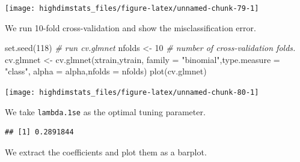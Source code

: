 \documentclass[
]{book}
\newenvironment{Shaded}{\begin{snugshade}}{\end{snugshade}}
\newcommand{\AttributeTok}[1]{\textcolor[rgb]{0.77,0.63,0.00}{#1}}
\newcommand{\CommentTok}[1]{\textcolor[rgb]{0.56,0.35,0.01}{\textit{#1}}}
\newcommand{\DecValTok}[1]{\textcolor[rgb]{0.00,0.00,0.81}{#1}}
\newcommand{\FloatTok}[1]{\textcolor[rgb]{0.00,0.00,0.81}{#1}}
\newcommand{\FunctionTok}[1]{\textcolor[rgb]{0.00,0.00,0.00}{#1}}
\newcommand{\NormalTok}[1]{#1}
\newcommand{\OtherTok}[1]{\textcolor[rgb]{0.56,0.35,0.01}{#1}}
\newcommand{\SpecialCharTok}[1]{\textcolor[rgb]{0.00,0.00,0.00}{#1}}
\newcommand{\StringTok}[1]{\textcolor[rgb]{0.31,0.60,0.02}{#1}}
\begin{document}
\begin{center}\texttt{[image: highdimstats\_files/figure-latex/unnamed-chunk-79-1]} \end{center}

We run 10-fold cross-validation and show the misclassification error.

\begin{Shaded}
\begin{Highlighting}[]
\FunctionTok{set.seed}\NormalTok{(}\DecValTok{118}\NormalTok{)}
\CommentTok{\# run cv.glmnet}
\NormalTok{nfolds }\OtherTok{\textless{}{-}} \DecValTok{10} \CommentTok{\# number of cross{-}validation folds.}
\NormalTok{cv.glmnet }\OtherTok{\textless{}{-}} \FunctionTok{cv.glmnet}\NormalTok{(xtrain,ytrain,}
                       \AttributeTok{family =} \StringTok{"binomial"}\NormalTok{,}\AttributeTok{type.measure =} \StringTok{"class"}\NormalTok{,}
                       \AttributeTok{alpha =}\NormalTok{ alpha,}\AttributeTok{nfolds =}\NormalTok{ nfolds)}
\FunctionTok{plot}\NormalTok{(cv.glmnet)}
\end{Highlighting}
\end{Shaded}

\begin{center}\texttt{[image: highdimstats\_files/figure-latex/unnamed-chunk-80-1]} \end{center}

We take \texttt{lambda.1se} as the optimal tuning parameter.

\begin{Shaded}
\end{Shaded}

\begin{verbatim}
## [1] 0.2891844
\end{verbatim}

We extract the coefficients and plot them as a barplot.
\end{document}

